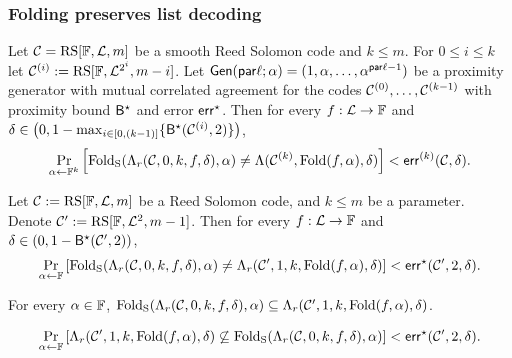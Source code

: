 \subsubsection{Folding preserves list decoding}

\begin{theorem}
    Let $\mathcal{C} = \mathrm{RS}[\mathbb{F}, \mathcal{L}, m]$ be a smooth Reed Solomon code and $k \leq m$. For $0 \leq i \leq k$ let $\mathcal{C}^{(i)} := \mathrm{RS}[\mathbb{F}, \mathcal{L}^{2^i}, m - i]$. Let $\mathsf{Gen}(\mathsf{par}\ell; \alpha) = (1, \alpha, \ldots, \alpha^{\mathsf{par}\ell - 1})$ be a proximity generator with mutual correlated agreement for the codes $\mathcal{C}^{(0)}, \ldots, \mathcal{C}^{(k-1)}$ with proximity bound ${\mathsf{B}}^\star$ and error $\mathsf{err}^\star$. Then for every $f : \mathcal{L} \to \mathbb{F}$ and $\delta \in \left(0, 1 - \max_{i \in [0,(k-1)]} \{ {\mathsf{B}}^\star(\mathcal{C}^{(i)}, 2) \} \right)$,
    \[
    \Pr_{\alpha \leftarrow \mathbb{F}^k} \left[
    \mathrm{Fold_S}(\Lambda_{r}(\mathcal{C}, 0, k, f, \delta), \alpha)
    \neq \Lambda(\mathcal{C}^{(k)}, \mathrm{Fold}(f, \alpha), \delta)
    \right] < \mathsf{err}^{(k)}(\mathcal{C}, \delta).
    \]
\end{theorem}

\begin{lemma}
    Let $\mathcal{C} := \mathrm{RS}[\mathbb{F}, \mathcal{L}, m]$ be a Reed Solomon code, and $k \leq m$ be a parameter. Denote $\mathcal{C}' := \mathrm{RS}[\mathbb{F}, \mathcal{L}^{2}, m - 1]$. Then for every $f : \mathcal{L} \to \mathbb{F}$ and $\delta \in (0, 1 - {\mathsf{B}}^\star(\mathcal{C}', 2))$,
    \[
    \Pr_{\alpha \leftarrow \mathbb{F}} \left[
    \mathrm{Fold_S}(\Lambda_{r}(\mathcal{C}, 0, k, f, \delta), \alpha)
    \neq \Lambda_{r}(\mathcal{C}', 1, k, \mathrm{Fold}(f, \alpha), \delta)
    \right] < \mathsf{err}^\star(\mathcal{C}', 2, \delta).
    \]
\end{lemma}
    
\begin{lemma}
    For every $\alpha \in \mathbb{F}$, $\mathrm{Fold_S}(\Lambda_{r}(\mathcal{C}, 0, k, f, \delta), \alpha) \subseteq \Lambda_{r}(\mathcal{C}', 1, k, \mathrm{Fold}(f, \alpha), \delta)$.
\end{lemma}

\begin{lemma}
    \[
    \Pr_{\alpha \leftarrow \mathbb{F}} \left[
    \Lambda_{r}(\mathcal{C}', 1, k, \mathrm{Fold}(f, \alpha), \delta)
    \not\subseteq \mathrm{Fold_S}(\Lambda_{r}(\mathcal{C}, 0, k, f, \delta), \alpha)
    \right] < \mathsf{err}^\star(\mathcal{C}', 2, \delta).
    \]
\end{lemma}

